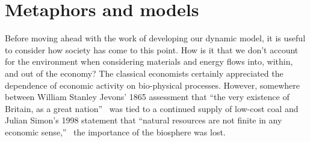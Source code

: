 \section{Metaphors and models}
\label{sec:metaphors_and_models}

Before moving ahead with the work of developing our dynamic model,
it is useful to consider how society has come to this point.
How is it that we don't account for the environment when 
considering materials and energy flows into, within, and out of the economy?
The classical economists certainly appreciated the dependence of
economic activity on bio-physical processes.\cite{Hall2011, Cleveland1987, Dale2012}
However, somewhere between William Stanley Jevons' 1865
assessment that
``the very existence of Britain, as a great nation''~\cite[IV.3]{Jevons1865}
was tied to a continued supply of low-cost coal 
and Julian Simon's 1998 statement that
``natural resources are not finite in any economic sense,''~\cite[p.~54]{Simon1998} %
the importance of the biosphere was lost.

%



